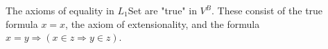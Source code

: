 The axioms of equality in $L_1$Set are "true" in $V^B$. These consist of the true formula $x = x$, the axiom of extensionality, and the formula $x = y \Rightarrow (x \in z \Rightarrow y \in z)$.